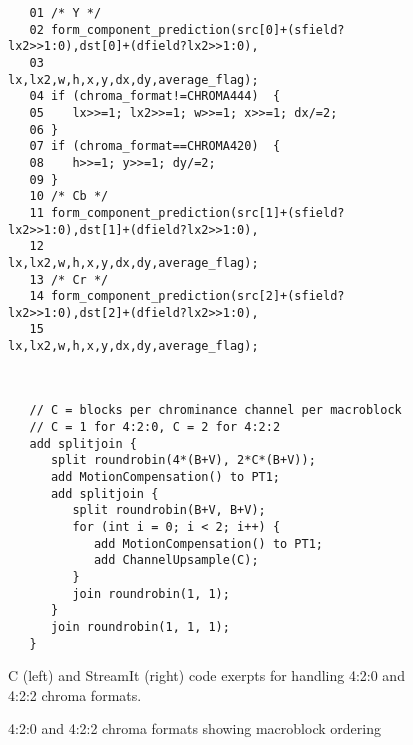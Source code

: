 \begin{figure*}[t]
 \begin{minipage}[t]{4.3in}{
  \begin{scriptsize}
   \begin{verbatim}
   01 /* Y */
   02 form_component_prediction(src[0]+(sfield?lx2>>1:0),dst[0]+(dfield?lx2>>1:0),
   03                           lx,lx2,w,h,x,y,dx,dy,average_flag);
   04 if (chroma_format!=CHROMA444)  {
   05    lx>>=1; lx2>>=1; w>>=1; x>>=1; dx/=2;
   06 }
   07 if (chroma_format==CHROMA420)  {
   08    h>>=1; y>>=1; dy/=2;
   09 }
   10 /* Cb */
   11 form_component_prediction(src[1]+(sfield?lx2>>1:0),dst[1]+(dfield?lx2>>1:0),
   12                           lx,lx2,w,h,x,y,dx,dy,average_flag);
   13 /* Cr */
   14 form_component_prediction(src[2]+(sfield?lx2>>1:0),dst[2]+(dfield?lx2>>1:0),
   15                           lx,lx2,w,h,x,y,dx,dy,average_flag);    
   \end{verbatim}
  \end{scriptsize}
 }
 \label{fig:chroma-stream}
 \end{minipage}
 ~~\vrule~~
 \begin{minipage}[t]{4.3in}{
  \begin{scriptsize}
   \begin{verbatim}
   // C = blocks per chrominance channel per macroblock 
   // C = 1 for 4:2:0, C = 2 for 4:2:2
   add splitjoin {
      split roundrobin(4*(B+V), 2*C*(B+V));
      add MotionCompensation() to PT1;
      add splitjoin {
         split roundrobin(B+V, B+V);
         for (int i = 0; i < 2; i++) {
            add MotionCompensation() to PT1;
            add ChannelUpsample(C);
         }
         join roundrobin(1, 1);
      }
      join roundrobin(1, 1, 1);
   }
   \end{verbatim}
  \end{scriptsize}
 }
 \end{minipage}
 \caption{C (left) and StreamIt (right) code exerpts for handling
          4:2:0 and 4:2:2 chroma formats.} %
 \label{fig:chroma-format-code}
\end{figure*}

\begin{figure}[t]
\begin{center}
   \caption{4:2:0 and 4:2:2 chroma formats showing macroblock ordering}
   \label{fig:chroma-block-layout}
\end{center}
\end{figure}